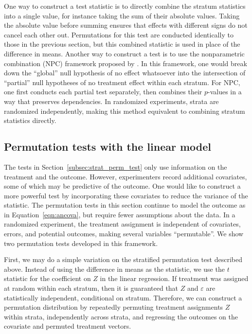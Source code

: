 \documentclass[12pt]{article}
\begin{document}
One way to construct a test statistic is to directly combine the stratum statistics into a single value, for instance taking the sum of their absolute values.
Taking the absolute value before summing ensures that effects with different signs do not cancel each other out.
Permutations for this test are conducted identically to those in the previous section, but this combined statistic is used in place of the difference in means.
Another way to construct a test is to use the nonparametric combination (NPC) framework proposed by \citet{pesarin_permutation_2010}.
In this framework, one would break down the ``global'' null hypothesis of no effect whatsoever into the intersection of ``partial'' null hypotheses of no treatment effect within each stratum.
For NPC, one first conducts each partial test separately, then combines their $p$-values in a way that preserves dependencies.
In randomized experiments, strata are randomized independently, making this method equivalent to combining stratum statistics directly.


\subsection{Permutation tests with the linear model}\label{subsec:lm_perm_tests}
The tests in Section~\ref{subsec:strat_perm_test} only use information on the treatment and the outcome.
However, experimenters record additional covariates, some of which may be predictive of the outcome.
One would like to construct a more powerful test by incorporating these covariates to reduce the variance of the statistic.
The permutation tests in this section continue to model the outcome as in Equation~\ref{eqn:ancova}, but require fewer assumptions about the data.
In a randomized experiment, the treatment assignment is independent of covariates, errors, and potential outcomes,
making several variables ``permutable''.
We show two permutation tests developed in this framework.

First, we may do a simple variation on the stratified permutation test described above.
Instead of using the difference in means as the statistic, we use the $t$ statistic for the coefficient on $Z$ in the linear regression.
If treatment was assigned at random within each stratum, then it is guaranteed that $Z$ and $\varepsilon$ are statistically independent, conditional on stratum.
Therefore, we can construct a permutation distribution by repeatedly permuting treatment assignments $Z$ within strata, independently across strata, and regressing the outcomes on the covariate and permuted treatment vectors.
\end{document}
